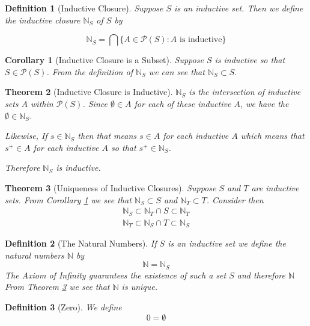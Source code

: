 \documentclass[12pt]{article}
\theoremstyle{break}
\newtheorem{definition}{Definition}[section]
\theoremstyle{break}
\newtheorem{theorem}{Theorem}[section]
\theoremstyle{break}
\newtheorem{corollary}[theorem]{Corollary}
\theoremstyle{break}
\theoremstyle{break}
\newtheorem{informal definition}[definition]{Informal Definition}
\begin{document}
\begin{definition}[Inductive Closure]
Suppose $S$ is an inductive set.
Then we define the inductive closure $\mathbb{N}_S$ of $S$ by

$$
\mathbb{N}_S = \bigcap \{A \in \mathcal{P}(S): A \text{ is inductive}\}
$$
\end{definition}

\begin{corollary}[Inductive Closure is a Subset]
\label{coor:indclosuresubset}
Suppose $S$ is inductive so that $S\in \mathcal{P}(S)$.
From the definition of $\mathbb{N}_S$ we can see that $\mathbb{N}_S \subset S$.
\end{corollary}

\begin{theorem}[Inductive Closure is Inductive]
$\mathbb{N}_S$ is the intersection of inductive sets $A$ within $\mathcal{P}(S)$.
Since $\emptyset \in A$ for each of these inductive $A$, we have the $\emptyset \in \mathbb{N}_S$.

Likewise, If $s\in \mathbb{N}_S$ then that means $s \in A$ for each inductive $A$ which means that $s^+\in A$ for each inductive $A$ so that $s^+\in\mathbb{N}_S$.

Therefore $\mathbb{N}_S$ is inductive.
\end{theorem}

\begin{theorem}[Uniqueness of Inductive Closures]
\label{thm:uniqueindclosure}
Suppose $S$ and $T$ are inductive sets.
From Corollary \ref{coor:indclosuresubset} we see that $\mathbb{N}_S\subset S$ and $\mathbb{N}_T \subset T$.
Consider then
\begin{align*}
\mathbb{N}_S \subset \mathbb{N}_T \cap S \subset \mathbb{N}_T\\
\mathbb{N}_T \subset \mathbb{N}_S \cap T \subset \mathbb{N}_S
\end{align*}
\end{theorem}

\begin{definition}[The Natural Numbers]
If $S$ is an inductive set we define the natural numbers $\mathbb{N}$ by
$$
\mathbb{N} = \mathbb{N}_S
$$
The Axiom of Infinity guarantees the existence of such a set $S$ and therefore $\mathbb{N}$
From Theorem \ref{thm:uniqueindclosure} we see that $\mathbb{N}$ is unique.
\end{definition}

\begin{definition}[Zero]
We define
$$
0 = \emptyset
$$
\end{definition}
\end{document}
